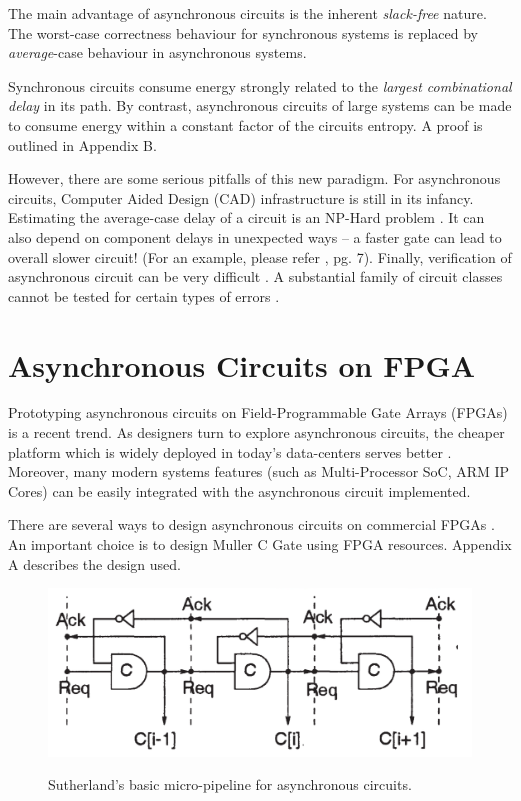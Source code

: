 \documentclass[10pt,journal,compsoc]{IEEEtran}
\begin{document}
The main advantage of asynchronous circuits is the inherent
\emph{slack-free} nature. The worst-case correctness behaviour for synchronous
systems is replaced by \emph{average}-case behaviour in asynchronous systems.

Synchronous circuits consume energy strongly related to the \emph{largest combinational
delay} in its path. By contrast, 
asynchronous circuits of large systems can be made to consume energy within a 
constant factor of the circuits entropy. A proof is outlined in Appendix B.

However, there are some serious pitfalls of this new paradigm.
For asynchronous circuits, Computer Aided Design (CAD) infrastructure is still in its infancy.
Estimating the average-case delay of a circuit 
is an NP-Hard problem \cite{seger_book}. It can also depend
on component delays in unexpected ways -- a faster gate can lead to overall
slower circuit! (For an example, please refer \cite{seger_book},
pg. 7). Finally, verification of asynchronous circuit can be very difficult 
\cite{async_test_survey}. A substantial family of circuit
classes cannot be tested for certain types of errors \cite{async_c_test}.

\section{Asynchronous Circuits on FPGA}

Prototyping asynchronous circuits on Field-Programmable Gate Arrays (FPGAs)
is a recent trend. As designers turn to explore asynchronous
circuits, the cheaper platform which is widely deployed in today's data-centers
serves better \cite{japan_fpga_paper}. Moreover, many modern systems features
(such as  Multi-Processor SoC, ARM IP Cores) can be easily
integrated with the  asynchronous circuit implemented.

There are several ways to design asynchronous circuits on commercial FPGAs 
\cite{japan_1} \cite{japan_2} \cite{japan_3} \cite{japan_4} \cite{japan_5}. An important choice is to
design Muller C Gate using FPGA resources. Appendix A describes the design
used.

\begin{figure} 
	\centering
	\includegraphics[width = 0.5 \textwidth]{micropipeline} \label{fig:micropipeline}
	\caption{Sutherland's basic micro-pipeline for asynchronous circuits.} 
	\label{fig:micropipeline}
\end{figure}
\end{document}
